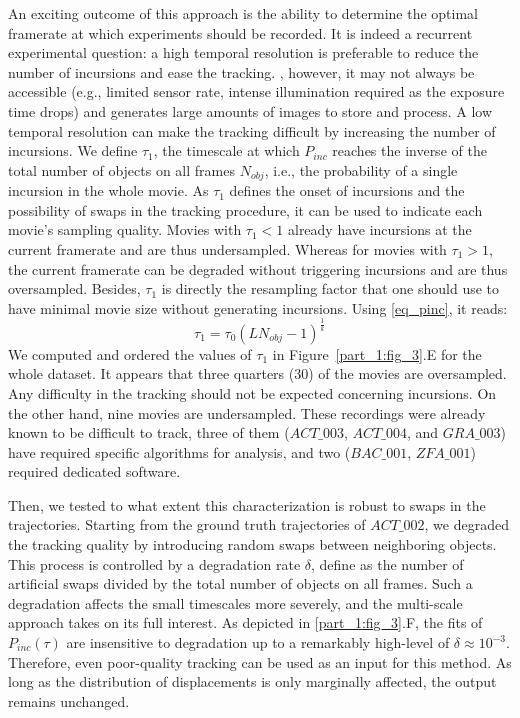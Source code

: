     An exciting outcome of this approach is the ability to determine the optimal framerate at which experiments should be recorded. It is indeed a recurrent experimental question: a high temporal resolution is preferable to reduce the number of incursions and ease the tracking. , however, it may not always be accessible (e.g., limited sensor rate, intense illumination required as the exposure time drops) and generates large amounts of images to store and process. A low temporal resolution can make the tracking difficult by increasing the number of incursions.
    We define $\tau_1$, the timescale at which $P_{inc}$ reaches the inverse of the total number of objects on all frames $N_{obj}$, i.e., the probability of a single incursion in the whole movie. As $\tau_1$ defines the onset of incursions and the possibility of swaps in the tracking procedure, it can be used to indicate each movie's sampling quality. Movies with $\tau_1<1$ already have incursions at the current framerate and are thus undersampled. Whereas for movies with $\tau_1>1$, the current framerate can be degraded without triggering incursions and are thus oversampled. Besides, $\tau_1$ is directly the resampling factor that one should use to have minimal movie size without generating incursions. Using \ref{eq_pinc}, it reads:
    \begin{equation}
        \label{eq:Pinc_tau0}
        \tau_1=\tau_0(LN_{obj}-1)^{\frac{1}{k}}
    \end{equation}
    We computed and ordered the values of $\tau_1$ in Figure~\ref{part_1:fig_3}.E for the whole dataset. It appears that three quarters (30) of the movies are oversampled. Any difficulty in the tracking should not be expected concerning incursions. On the other hand, nine movies are undersampled. These recordings were already known to be difficult to track, three of them ($ACT\_003$, $ACT\_004$, and $GRA\_003$) have required specific algorithms for analysis, and two ($BAC\_001$, $ZFA\_001$) required dedicated software.

    Then, we tested to what extent this characterization is robust to swaps in the trajectories. Starting from the ground truth trajectories of $ACT\_002$, we degraded the tracking quality by introducing random swaps between neighboring objects. This process is controlled by a degradation rate $\delta$, define as the number of artificial swaps divided by the total number of objects on all frames. Such a degradation affects the small timescales more severely, and the multi-scale approach takes on its full interest. As depicted in \ref{part_1:fig_3}.F, the fits of $P_{inc}(\tau)$ are insensitive to degradation up to a remarkably high-level of $\delta \approx 10^{-3}$. Therefore, even poor-quality tracking can be used as an input for this method. As long as the distribution of displacements is only marginally affected, the output remains unchanged.


